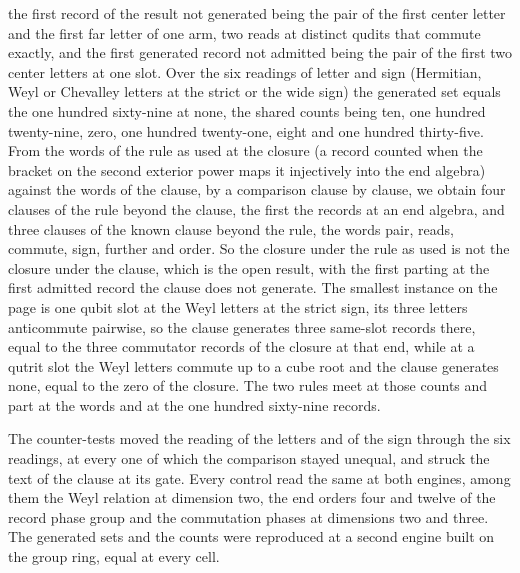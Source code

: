 \begin{chproof}[exact]
the first record of the result not generated being the pair of the first center letter and the first far letter of one arm, two reads at distinct qudits that commute exactly, and the first generated record not admitted being the pair of the first two center letters at one slot. Over the six readings of letter and sign (Hermitian, Weyl or Chevalley letters at the strict or the wide sign) the generated set equals the one hundred sixty-nine at none, the shared counts being ten, one hundred twenty-nine, zero, one hundred twenty-one, eight and one hundred thirty-five. From the words of the rule as used at the closure (a record counted when the bracket on the second exterior power maps it injectively into the end algebra) against the words of the clause, by a comparison clause by clause, we obtain four clauses of the rule beyond the clause, the first the records at an end algebra, and three clauses of the known clause beyond the rule, the words pair, reads, commute, sign, further and order. So the closure under the rule as used is not the closure under the clause, which is the open result, with the first parting at the first admitted record the clause does not generate. The smallest instance on the page is one qubit slot at the Weyl letters at the strict sign, its three letters anticommute pairwise, so the clause generates three same-slot records there, equal to the three commutator records of the closure at that end, while at a qutrit slot the Weyl letters commute up to a cube root and the clause generates none, equal to the zero of the closure. The two rules meet at those counts and part at the words and at the one hundred sixty-nine records.

The counter-tests moved the reading of the letters and of the sign through the six readings, at every one of which the comparison stayed unequal, and struck the text of the clause at its gate. Every control read the same at both engines, among them the Weyl relation at dimension two, the end orders four and twelve of the record phase group and the commutation phases at dimensions two and three. The generated sets and the counts were reproduced at a second engine built on the group ring, equal at every cell.
\end{chproof}
